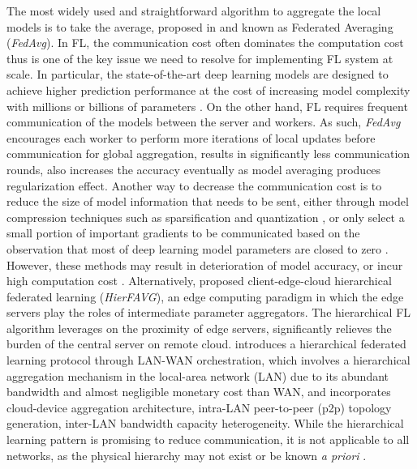 \documentclass[10pt,twocolumn,letterpaper]{article}
\theoremstyle{definition}
\begin{document}
The most widely used and straightforward algorithm to aggregate the local models is to take the average, proposed in \cite{mcmahan2017communication} and known as Federated Averaging (\textit{FedAvg}).
In FL, the communication cost often dominates the computation cost \cite{mcmahan2017communication} thus is one of the key issue we need to resolve for implementing FL system at scale. In particular, the state-of-the-art deep learning models are designed to achieve higher prediction performance at the cost of increasing model complexity with millions or billions of parameters \cite{devlin2018bert, brown2020language}. On the other hand, FL requires frequent communication of the models between the server and workers. As such, \textit{FedAvg} \cite{mcmahan2017communication} encourages each worker to perform more iterations of local updates before communication for global aggregation, results in significantly less communication rounds, also increases the accuracy eventually as model averaging produces regularization effect. Another way to decrease the communication cost is to reduce the size of model information that needs to be sent, either through model compression techniques such as sparsification \cite{stich2018sparsified} and quantization \cite{caldas2018expanding}, or only select a small portion of important gradients to be communicated \cite{tao2018esgd} based on the observation that most of deep learning model parameters are closed to zero \cite{strom2015scalable}.  However, these methods may result in deterioration of model accuracy, or incur high computation cost \cite{lim2020federated}. Alternatively, \cite{liu2020client} proposed client-edge-cloud hierarchical federated learning (\textit{HierFAVG}), an edge computing paradigm in which the edge servers play the roles of intermediate parameter aggregators. The hierarchical FL algorithm leverages on the proximity of edge servers, significantly relieves the burden of the central server on remote cloud. 
\cite{yuan2020hierarchical} introduces a hierarchical federated learning protocol through LAN-WAN orchestration, which involves a hierarchical aggregation mechanism in the local-area network (LAN) due to its abundant bandwidth and almost negligible monetary cost than WAN, and incorporates cloud-device aggregation architecture, intra-LAN peer-to-peer (p2p) topology generation, inter-LAN bandwidth capacity heterogeneity.
While the hierarchical learning pattern is promising to reduce communication, it is not applicable to all networks, as the physical hierarchy may not exist or be known \textit{a priori} \cite{li2020federated}. 
\end{document}
